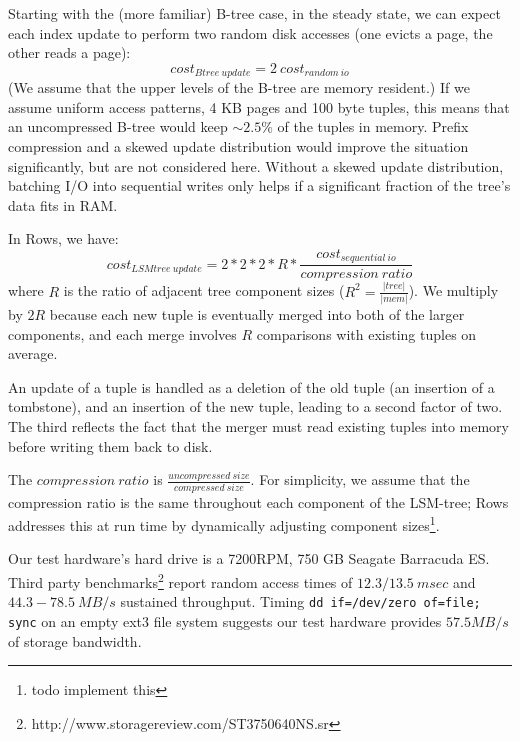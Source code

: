\documentclass{sig-alternate-sigmod08}
\newcommand{\rows}{Rows\xspace}
\begin{document}
Starting with the (more familiar) B-tree case, in the steady state, we
can expect each index update to perform two random disk accesses (one
evicts a page, the other reads a page):
\[
   cost_{Btree~update}=2~cost_{random~io}
\]
(We assume that the upper levels of the B-tree are memory resident.)  If
we assume uniform access patterns, 4 KB pages and 100 byte tuples,
this means that an uncompressed B-tree would keep $\sim2.5\%$ of the
tuples in memory.  Prefix compression and a skewed update distribution
would improve the situation significantly, but are not considered
here.  Without a skewed update distribution, batching I/O into
sequential writes only helps if a significant fraction of the tree's
data fits in RAM.

In \rows, we have:
\[
   cost_{LSMtree~update}=2*2*2*R*\frac{cost_{sequential~io}}{compression~ratio}  %
\]
where $R$ is the ratio of adjacent tree component sizes
($R^2=\frac{|tree|}{|mem|}$).  We multiply by $2R$ because each new
tuple is eventually merged into both of the larger components, and
each merge involves $R$ comparisons with existing tuples on average.

An update of a tuple is handled as a deletion of the old tuple (an
insertion of a tombstone), and an insertion of the new tuple, leading
to a second factor of two.  The third reflects the fact that the
merger must read existing tuples into memory before writing them back
to disk.

The $compression~ratio$ is
$\frac{uncompressed~size}{compressed~size}$.  For simplicity, we
assume that the compression ratio is the same throughout each
component of the LSM-tree; \rows addresses this at run time by
dynamically adjusting component sizes\footnote{todo implement this}.

Our test hardware's hard drive is a 7200RPM, 750 GB Seagate Barracuda
ES.  
Third party
benchmarks\footnote{http://www.storagereview.com/ST3750640NS.sr}
report random access times of $12.3/13.5~msec$ and $44.3-78.5~MB/s$
sustained throughput.  Timing {\tt dd if=/dev/zero of=file; sync} on an
empty ext3 file system suggests our test hardware provides $57.5MB/s$ of
storage bandwidth.

\end{document}
